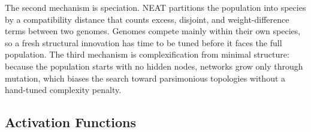\documentclass[12pt]{article}
\begin{document}
The second mechanism is speciation.
NEAT partitions the population into species by a compatibility distance that counts excess, disjoint, and weight-difference terms between two genomes.
Genomes compete mainly within their own species, so a fresh structural innovation has time to be tuned before it faces the full population.
The third mechanism is complexification from minimal structure: because the population starts with no hidden nodes, networks grow only through mutation, which biases the search toward parsimonious topologies without a hand-tuned complexity penalty.



\subsection{Activation Functions}
\label{subsec:activation-functions} 
\end{document}

